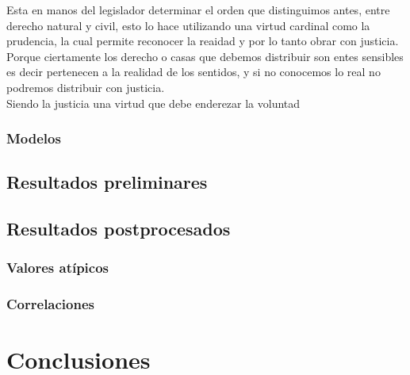 \documentclass[12pt]{book}
\begin{document}
Esta en manos del legislador determinar el orden que distinguimos antes, entre derecho natural y civil, esto lo hace utilizando una virtud cardinal como la prudencia, la cual permite reconocer la reaidad y por lo tanto obrar con justicia.
Porque ciertamente los derecho o casas que debemos distribuir son entes sensibles es decir pertenecen a la realidad de los sentidos, y si no conocemos lo real no podremos distribuir con justicia.
\\
Siendo la justicia una virtud que debe enderezar la voluntad
\subsection{Modelos}
\section{Resultados preliminares}
\section{Resultados postprocesados}
\subsection{Valores atípicos}
\subsection{Correlaciones}
\chapter{Conclusiones}
\end{document}
